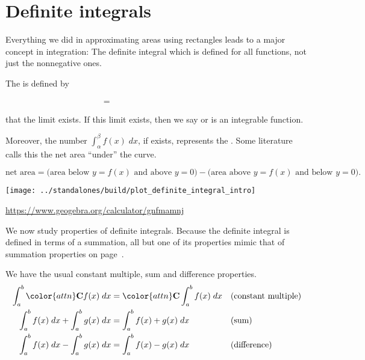 \documentclass[../main.tex]{subfiles}
\begin{document}
 \section{Definite integrals}
  Everything we did in approximating areas using rectangles leads to a major concept in integration: The definite integral which is defined for all functions, not just the nonnegative ones.
  \begin{mdframed}[style=withref-compact]
    The  is defined by 
    \begin{equation} \label{eq:definite-integral} 
      \phantom{\int_{\alpha}^{\beta} f(x) \;dx} = \hspace{3in}
    \end{equation}
     that the limit exists. If this limit exists, then we say  or is an integrable function. 

    Moreover, the number \(\int_{\alpha}^{\beta} f(x) \;dx\), if exists, represents the  . Some literature calls this the net area ``under'' the curve.
  \end{mdframed}
  \[
    \text{net area} = \bigg(\text{area below \(y = f(x)\) and above \(y = 0\)}\bigg) - \bigg(\text{area above \(y = f(x)\) and below \(y = 0\)}\bigg).
  \]
  
  \texttt{[image: ../standalones/build/plot\_definite\_integral\_intro]}

  \url{https://www.geogebra.org/calculator/gnfmamnj}
  

  \bigskip
  We now study properties of definite integrals. Because the definite integral is defined in terms of a summation, all but one of its properties mimic that of summation properties on page~\pageref{page:summation-properties}.

  We have the usual constant multiple, sum and difference properties.
  \begin{align*}
    \int_{a}^{b} {\color{attn} \mathbf{C}} f(x) \;dx &= {\color{attn} \mathbf{C}} \int_{a}^{b} f(x) \;dx && \text{(constant multiple)}\\
    \int_{a}^{b} f(x) \;dx + \int_{a}^{b} g(x) \;dx &= \int_{a}^{b} f(x) + g(x) \;dx && \text{(sum)} \\
    \int_{a}^{b} f(x) \;dx - \int_{a}^{b} g(x) \;dx &= \int_{a}^{b} f(x) - g(x) \;dx && \text{(difference)}
  \end{align*}
  \clearpage
    
\end{document}
